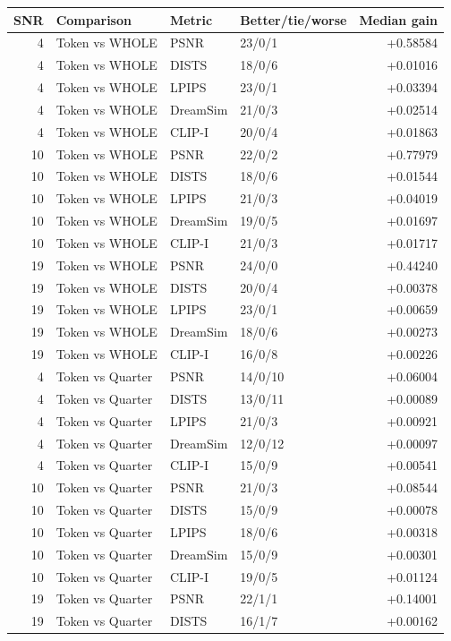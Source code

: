 \documentclass[10pt,letterpaper]{article}
\begin{document}
\begin{longtable}{@{}rlllr@{}}\toprule
SNR & Comparison & Metric & Better/tie/worse & Median gain\\\midrule\endhead
4 & Token vs WHOLE & PSNR & 23/0/1 & +0.58584\\
4 & Token vs WHOLE & DISTS & 18/0/6 & +0.01016\\
4 & Token vs WHOLE & LPIPS & 23/0/1 & +0.03394\\
4 & Token vs WHOLE & DreamSim & 21/0/3 & +0.02514\\
4 & Token vs WHOLE & CLIP-I & 20/0/4 & +0.01863\\
10 & Token vs WHOLE & PSNR & 22/0/2 & +0.77979\\
10 & Token vs WHOLE & DISTS & 18/0/6 & +0.01544\\
10 & Token vs WHOLE & LPIPS & 21/0/3 & +0.04019\\
10 & Token vs WHOLE & DreamSim & 19/0/5 & +0.01697\\
10 & Token vs WHOLE & CLIP-I & 21/0/3 & +0.01717\\
19 & Token vs WHOLE & PSNR & 24/0/0 & +0.44240\\
19 & Token vs WHOLE & DISTS & 20/0/4 & +0.00378\\
19 & Token vs WHOLE & LPIPS & 23/0/1 & +0.00659\\
19 & Token vs WHOLE & DreamSim & 18/0/6 & +0.00273\\
19 & Token vs WHOLE & CLIP-I & 16/0/8 & +0.00226\\
4 & Token vs Quarter & PSNR & 14/0/10 & +0.06004\\
4 & Token vs Quarter & DISTS & 13/0/11 & +0.00089\\
4 & Token vs Quarter & LPIPS & 21/0/3 & +0.00921\\
4 & Token vs Quarter & DreamSim & 12/0/12 & +0.00097\\
4 & Token vs Quarter & CLIP-I & 15/0/9 & +0.00541\\
10 & Token vs Quarter & PSNR & 21/0/3 & +0.08544\\
10 & Token vs Quarter & DISTS & 15/0/9 & +0.00078\\
10 & Token vs Quarter & LPIPS & 18/0/6 & +0.00318\\
10 & Token vs Quarter & DreamSim & 15/0/9 & +0.00301\\
10 & Token vs Quarter & CLIP-I & 19/0/5 & +0.01124\\
19 & Token vs Quarter & PSNR & 22/1/1 & +0.14001\\
19 & Token vs Quarter & DISTS & 16/1/7 & +0.00162\\

\end{longtable}
\end{document}
